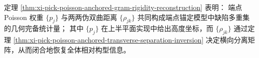 \begin{remark}[高度与横向分离的完备性]\label{rem:xi-pick-poisson-anchored-gram-rigidity-sufficient-statistic}
定理 \ref{thm:xi-pick-poisson-anchored-gram-rigidity-reconstruction} 表明：
端点 Poisson 权重 \(\{p_j\}\) 与两两伪双曲距离 \(\{\rho_{jk}\}\) 共同构成端点锚定模型中缺陷多重集的几何完备统计量；
其中 \(\{p_j\}\) 在上半平面实现中给出高度坐标，而 \(\{\rho_{jk}\}\) 通过定理 \ref{thm:xi-pick-poisson-anchored-transverse-separation-inversion} 决定横向分离矩阵，从而闭合地恢复全体相对构型信息。
\end{remark}

\endinput
